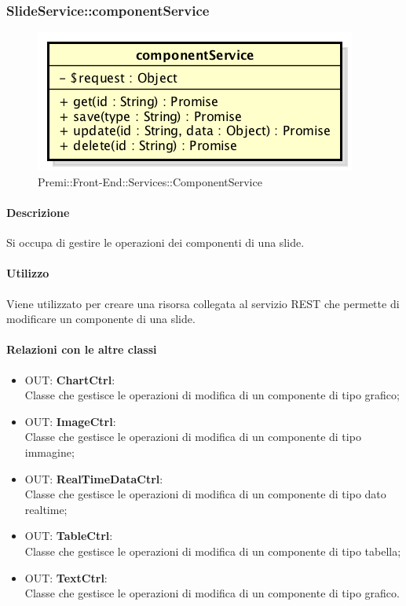 \subsubsection{SlideService::componentService}
	\begin{figure}[h]
		\centering
		\includegraphics[width=0.5\linewidth]{img/premi_front_end_services_componentservice}
		\caption[Premi::Front-End::Services::ComponentService]{Premi::Front-End::Services::ComponentService}
	\end{figure}
	
	\paragraph{Descrizione}
	Si occupa di gestire le operazioni dei componenti di una slide.
	
	\paragraph{Utilizzo}
	Viene utilizzato per creare una risorsa collegata al servizio REST che permette di modificare un componente di una slide.
	
	\paragraph{Relazioni con le altre classi}
	\begin{itemize}
		\item OUT: \textbf{ChartCtrl}:\\
			Classe che gestisce le operazioni di modifica di un componente di tipo grafico;
		\item OUT: \textbf{ImageCtrl}:\\
			Classe che gestisce le operazioni di modifica di un componente di tipo immagine;
		\item OUT: \textbf{RealTimeDataCtrl}:\\
			Classe che gestisce le operazioni di modifica di un componente di tipo dato realtime;
		\item OUT: \textbf{TableCtrl}:\\
			Classe che gestisce le operazioni di modifica di un componente di tipo tabella;
		\item OUT: \textbf{TextCtrl}:\\
			Classe che gestisce le operazioni di modifica di un componente di tipo grafico.
	\end{itemize}
	
